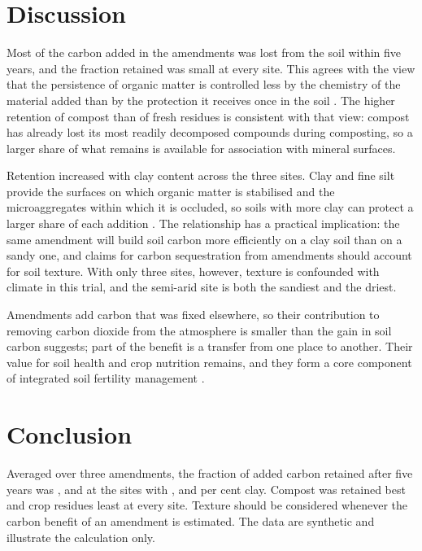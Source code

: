 \section{Discussion}

Most of the carbon added in the amendments was lost from the soil within five
years, and the fraction retained was small at every site. This agrees with
the view that the persistence of organic matter is controlled less by the
chemistry of the material added than by the protection it receives once in the
soil \parencite{vonlutzow2006}. The higher retention of compost than of fresh
residues is consistent with that view: compost has already lost its most
readily decomposed compounds during composting, so a larger share of what
remains is available for association with mineral surfaces.

Retention increased with clay content across the three sites. Clay and fine
silt provide the surfaces on which organic matter is stabilised and the
microaggregates within which it is occluded, so soils with more clay can
protect a larger share of each addition \parencite{six2002}. The relationship
has a practical implication: the same amendment will build soil carbon more
efficiently on a clay soil than on a sandy one, and claims for carbon
sequestration from amendments should account for soil texture. With only three
sites, however, texture is confounded with climate in this trial, and the
semi-arid site is both the sandiest and the driest.

Amendments add carbon that was fixed elsewhere, so their contribution to
removing carbon dioxide from the atmosphere is smaller than the gain in soil
carbon suggests; part of the benefit is a transfer from one place to another.
Their value for soil health and crop nutrition remains, and they form a core
component of integrated soil fertility management \parencite{vanlauwe2010}.

\section{Conclusion}

Averaged over three amendments, the fraction of added carbon retained after
five years was ,  and  at the
sites with ,  and  per cent clay. Compost was retained best and crop
residues least at every site. Texture should be considered whenever the carbon
benefit of an amendment is estimated. The data are synthetic and illustrate the
calculation only.
